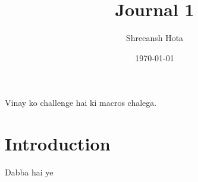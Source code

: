 \documentclass[11pt]{scrartcl}
\title{Journal 1}
\author{Shreeansh Hota}
\date{\today}
\begin{document}
\maketitle

Vinay ko challenge hai ki macros chalega.

\section{Introduction}

\begin{theorem}
    Dabba hai ye
\end{theorem}
\end{document}
